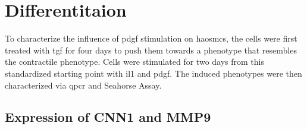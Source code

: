 \section{Differentitaion}
\label{sec:differentiation}
To characterize the influence of \ac{pdgf} stimulation on \acp{haosmc}, the cells were first treated with \ac{tgf} for four days to push them towards a phenotype that resembles the contractile phenotype. Cells were stimulated for two days from this standardized starting point with \ac{il1} and \ac{pdgf}. The induced phenotypes were then characterized via \ac{qpcr} and Seahorse Assay.

    \subsection{Expression of CNN1 and MMP9}
    \label{subsec:qPCR}

